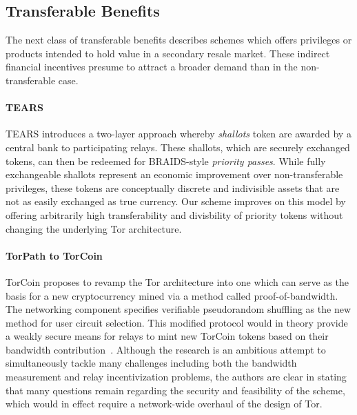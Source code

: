 \subsection{Transferable Benefits}

The next class of transferable benefits describes schemes which offers
privileges or products intended to hold value in a secondary resale market. These
indirect financial incentives presume to attract a broader demand than in the
non-transferable case.

\paragraph*{TEARS} TEARS introduces a two-layer approach whereby \emph{shallots}
token are awarded by a central bank to participating relays. These shallots,
which are securely exchanged tokens, can then be redeemed for BRAIDS-style
\emph{priority passes}. While fully exchangeable shallots represent an economic
improvement over non-transferable privileges, these tokens are conceptually
discrete and indivisible assets that are not as easily exchanged as true
currency. Our scheme improves on this model by offering arbitrarily high
transferability and divisbility of priority tokens without changing the
underlying Tor architecture.

\paragraph*{TorPath to TorCoin} TorCoin proposes to revamp the Tor
architecture into one which can serve as the basis for a new cryptocurrency
mined via a method called proof-of-bandwidth. The networking component specifies
verifiable pseudorandom shuffling as the new method for user circuit
selection. This modified protocol would in theory provide a weakly secure means
for relays to mint new TorCoin tokens based on their bandwidth
contribution~\cite{ghosh2014torpath}. Although the research is an ambitious
attempt to simultaneously tackle many challenges including both the bandwidth
measurement and relay incentivization problems, the authors are clear in stating
that many questions remain regarding the security and feasibility of the scheme,
which would in effect require a network-wide overhaul of the design of Tor.

